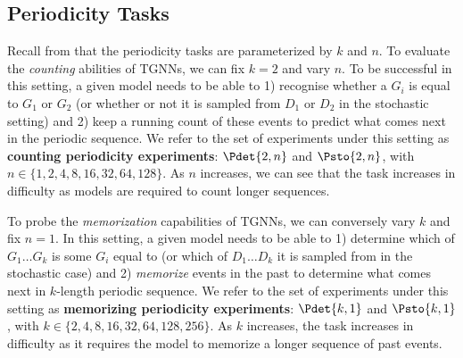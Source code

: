 
\subsection{Periodicity Tasks}
 Recall from  that the periodicity tasks are parameterized by $k$ and $n$. To evaluate the \textit{counting} abilities of TGNNs, we can fix $k = 2$ and vary $n$. To be successful in this setting, a given model needs to be able to 1) recognise whether a $G_i$ is equal to $G_1$ or $G_2$ (or whether or not it is sampled from $D_1$ or $D_2$ in the stochastic setting) and 2) keep a running count of these events to predict what comes next in the periodic sequence. We refer to the set of experiments under this setting as \textbf{counting periodicity experiments}: $\Pdet{2, n}$ and $\Psto{2, n}$, with $n \in \{ 1, 2, 4, 8, 16, 32, 64, 128 \}$. As $n$ increases, we can see that the task increases in difficulty as models are required to count longer sequences. 

 To probe the \textit{memorization} capabilities of TGNNs, we can conversely vary $k$ and fix $n = 1$. In this setting, a given model needs to be able to 1) determine which of $G_1 \dots G_k$ is some $G_i$ equal to (or which of $D_1 \dots D_k$ it is sampled from in the stochastic case) and 2) \textit{memorize} events in the past to determine what comes next in $k$-length periodic sequence. We refer to the set of experiments under this setting as \textbf{memorizing periodicity experiments}: $\Pdet{k, 1}$ and $\Psto{k, 1}$, with $k \in \{ 2, 4, 8, 16, 32, 64, 128, 256 \}$. As $k$ increases, the task increases in difficulty as it requires the model to memorize a longer sequence of past events. 


